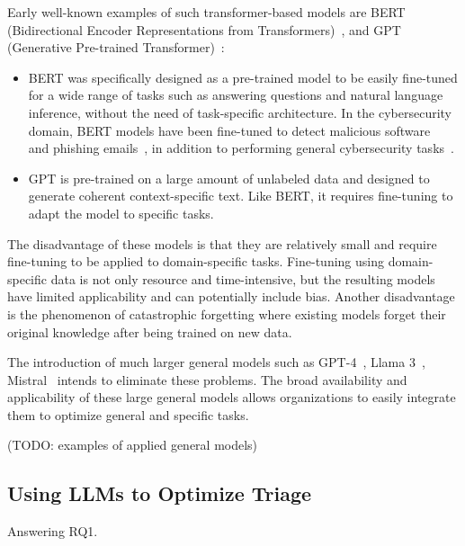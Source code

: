 Early well-known examples of such transformer-based models are BERT
(Bidirectional Encoder Representations from Transformers)\ \citep{devlin2018bert}, and
GPT (Generative Pre-trained Transformer)\ \citep{radford2018improving}:
\begin{itemize}
    \item BERT was specifically designed as a pre-trained model to be easily fine-tuned for a wide range of tasks such
    as answering questions and natural language inference, without the need of task-specific architecture.
    In the cybersecurity domain, BERT models have been fine-tuned to detect malicious
    software\ \citep{rahali2021malbert} and phishing emails\ \citep{lee2020catbert}, in addition to performing general
    cybersecurity tasks\ \citep{bayer2024cysecbert}.
    \item GPT is pre-trained on a large amount of unlabeled data and designed to generate coherent context-specific
    text.
    Like BERT, it requires fine-tuning to adapt the model to specific tasks.
\end{itemize}

The disadvantage of these models is that they are relatively small and require fine-tuning to be applied to
domain-specific tasks.
Fine-tuning using domain-specific data is not only resource and time-intensive, but the resulting models have limited
applicability and can potentially include bias.
Another disadvantage is the phenomenon of catastrophic forgetting where existing models forget their original knowledge
after being trained on new data.

The introduction of much larger general models such as GPT-4\ \citep{achiam2023gpt}, Llama 3\ \citep{meta:llama3},
Mistral\ \citep{jiang2023mistral} intends to eliminate these problems.
The broad availability and applicability of these large general models allows organizations to easily integrate them to
optimize general and specific tasks.


(TODO: examples of applied general models) %

\subsection{Using LLMs to Optimize Triage}
\label{subsec:rq1-llms-in-context}

Answering RQ1.